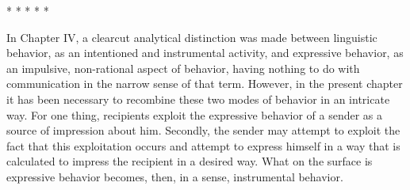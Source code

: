 \documentclass[twoside,symmetric,nobib,justified]{tufte-book}
\begin{document}
\vspace{.2in}
\begin{centering}

\Large{* * * * *}

\end{centering}
\vspace{.17in}

\noindent In Chapter IV, a clearcut analytical distinction was made between
linguistic behavior, as an intentioned and instru­mental activity, and
expressive behavior, as an impulsive, non-rational aspect of behavior,
having nothing to do with communica­tion in the narrow sense of that
term. However, in the present chapter it has been necessary to recombine
these two modes of behavior in an intricate way. For one thing,
recipients exploit the expressive behavior of a sender as a source of
impression about him. Secondly, the sender may attempt to exploit the
fact that this exploitation occurs and attempt to express himself in a
way that is calculated to impress the recipient in a desired way. What
on the surface is expressive behavior becomes, then, in a sense,
instrumental behavior.
\end{document}
